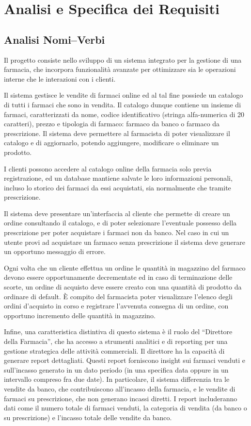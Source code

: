 \chapter{Analisi e Specifica dei Requisiti}

\section{Analisi Nomi--Verbi}
Il progetto consiste nello sviluppo di un sistema integrato per la gestione di una farmacia, che incorpora funzionalità avanzate per ottimizzare sia le operazioni interne che le interazioni con i clienti.

\noindent Il sistema gestisce le vendite di farmaci online ed al tal fine possiede un catalogo di tutti i farmaci che sono in vendita. Il catalogo dunque contiene un insieme di farmaci, caratterizzati da nome, codice identificativo (stringa alfa-numerica di 20 caratteri), prezzo e tipologia di farmaco: farmaco da banco o farmaco da prescrizione. Il sistema deve permettere al farmacista di poter visualizzare il catalogo e di aggiornarlo, potendo aggiungere, modificare o eliminare un prodotto.

\noindent I clienti possono accedere al catalogo online della farmacia solo previa registrazione, ed un database mantiene salvate le loro informazioni personali, incluso lo storico dei farmaci da essi acquistati, sia normalmente che tramite prescrizione.

\noindent Il sistema deve presentare un'interfaccia al cliente che permette di creare un ordine consultando il catalogo, e di poter selezionare l'eventuale possesso della prescrizione per poter acquistare i farmaci non da banco. Nel caso in cui un utente provi ad acquistare un farmaco senza prescrizione il sistema deve generare un opportuno messaggio di errore.

\noindent Ogni volta che un cliente effettua un ordine le quantità in magazzino del farmaco devono essere opportunamente decrementate ed in caso di terminazione delle scorte, un ordine di acquisto deve essere creato con una quantità di prodotto da ordinare di default. \`E compito del farmacista poter visualizzare l'elenco degli ordini d'acquisto in corso e registrare l'avvenuta consegna di un ordine, con opportuno incremento delle quantità in magazzino.

\noindent Infine, una caratteristica distintiva di questo sistema è il ruolo del ``Direttore della Farmacia'', che ha accesso a strumenti analitici e di reporting per una gestione strategica delle attività commerciali. Il direttore ha la capacità di generare report dettagliati. Questi report forniscono insight sui farmaci venduti e sull'incasso generato in un dato periodo (in una specifica data oppure in un intervallo compreso fra due date). In particolare, il sistema differenzia tra le vendite da banco, che contribuiscono all'incasso della farmacia, e le vendite di farmaci su prescrizione, che non generano incassi diretti. I report includeranno dati come il numero totale di farmaci venduti, la categoria di vendita (da banco o su prescrizione) e l'incasso totale delle vendite da banco.
